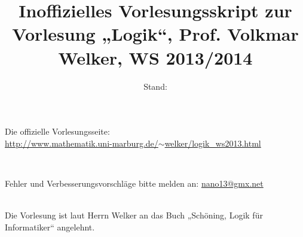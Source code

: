 \documentclass[a4paper]{scrartcl}
\begin{document}

\title{Inoffizielles Vorlesungsskript zur Vorlesung „Logik“, Prof. Volkmar Welker, WS 2013/2014}
\author{Stand:} %
\maketitle

\noindent
\begin{center}
Die offizielle Vorlesungsseite:\\
\href{http://www.mathematik.uni-marburg.de/~welker/logik\_ws2013.html}{http://www.mathematik.uni-marburg.de/$\sim$welker/logik\_ws2013.html}
\end{center}

\noindent\\
\begin{center}\begin{Large}Fehler und Verbesserungsvorschläge bitte melden an: \href{mailto:nano13@gmx.net}{nano13@gmx.net}\end{Large}\end{center}

\noindent\\
Die Vorlesung ist laut Herrn Welker an das Buch „Schöning, Logik für Informatiker“ angelehnt.

\tableofcontents

\newpage


\end{document}
